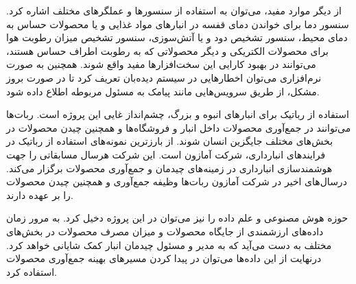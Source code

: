 از دیگر موارد مفید، می‌توان به استفاده از سنسورها و عملگرهای مختلف اشاره کرد. سنسور دما برای خواندن دمای قفسه در انبارهای مواد غذایی و یا محصولات حساس به دمای محیط، سنسور تشخیص دود و یا آتش‌سوزی، سنسور تشخیص میزان رطوبت هوا برای محصولات الکتریکی و دیگر محصولاتی که به رطوبت اطراف حساس هستند، می‌توانند در بهبود  کارایی این سخت‌افزارها مفید واقع شوند. همچنین به صورت نرم‌افزاری می‌توان اخطارهایی در سیستم دیده‌بان تعریف کرد تا در صورت بروز مشکل، از طریق سرویس‌هایی مانند پیامک به مسئول مربوطه اطلاع داده شود.

استفاده از رباتیک برای انبارهای انبوه و بزرگ، چشم‌انداز غایی این پروژه است. ربات‌ها می‌توانند در جمع‌آوری محصولات داخل انبار و فروشگاه‌ها و همچنین چیدن محصولات در بخش‌های مختلف جایگزین انسان شوند. از بارزترین نمونه‌های استفاده از رباتیک در فرایندهای انبارداری، شرکت آمازون است. این شرکت هرسال مسابقاتی را جهت هوشمندسازی انبارداری در زمینه‌های چیدمان و جمع‌آوری محصولات برگزار می‌کند. درسال‌های اخیر در شرکت آمازون ربات‌ها وظیفه جمع‌آوری و همچنین چیدن محصولات را بر عهده دارند\cite{Amazon}.

حوزه هوش مصنوعی و علم داده را نیز می‌توان در این پروژه دخیل کرد. به مرور زمان داده‌های ارزشمندی از جایگاه محصولات و میزان مصرف محصولات در بخش‌های مختلف به دست می‌آید که به مدیر و مسئول چیدمان انبار کمک شایانی خواهد کرد. درنهایت از این داده‌ها می‌توان در پیدا کردن مسیرهای بهینه جمع‌آوری محصولات استفاده کرد.